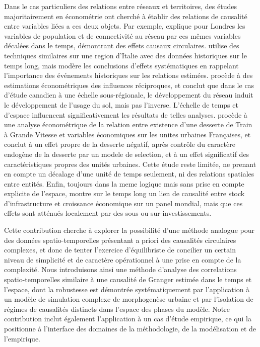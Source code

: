 \documentclass[french]{./sageo}
\begin{document}
Dans le cas particuliers des relations entre réseaux et territoires, des études majoritairement en économétrie ont cherché à établir des relations de causalité entre variables liées a ces deux objets. Par exemple, \cite{levinson2008density} explique pour Londres les variables de population et de connectivité au réseau par ces mêmes variables décalées dans le temps, démontrant des effets causaux circulaires. \cite{doi:10.1068/b39089}
 utilise des techniques similaires sur une region d'Italie avec des données historiques sur le temps long, mais modère les conclusions d'effets systématiques en rappelant l'importance des événements historiques sur les relations estimées. \cite{cuthbert2005empirical} procède à des estimations économétriques des influences réciproques, et conclut que dans le cas d'étude canadien à une échelle sous-régionale, le développement du réseau induit le développement de l'usage du sol, mais pas l'inverse. L'échelle de temps et d'espace influencent significativement les résultats de telles analyses. %
 procède à une analyse économétrique de la relation entre existence d'une desserte de Train à Grande Vitesse et variables économiques sur les unites urbaines Françaises, et conclut à un effet propre de la desserte négatif, après contrôle du caractère endogène de la desserte par un modele de selection, et à un effet significatif des caractéristiques propres des unités urbaines. Cette étude reste limitée, ne prenant en compte un décalage d'une unité de temps seulement, ni des relations spatiales entre entités. Enfin, toujours dans la meme logique mais sans prise en compte explicite de l'espace, %
  montre sur le temps long un lien de causalité entre stock d'infrastructure et croissance économique sur un panel mondial, mais que ces effets sont atténués localement par des sous ou sur-investissements.



Cette contribution cherche à explorer la possibilité d'une méthode analogue pour des données spatio-temporelles présentant a priori des causalités circulaires complexes, et donc de tenter l'exercice d'équilibriste de concilier un certain niveau de simplicité et de caractère opérationnel à une prise en compte de la complexité. Nous introduisons ainsi une méthode d'analyse des correlations spatio-temporelles similaire à une causalité de Granger estimée dans le temps et l'espace, dont la robustesse est démontrée systématiquement par l'application à un modèle de simulation complexe de morphogenèse urbaine et par l'isolation de régimes de causalités distincts dans l'espace des phases du modèle. Notre contribution inclut également l'application à un cas d'étude empirique, ce qui la positionne à l'interface des domaines de la méthodologie, de la modélisation et de l'empirique.
\end{document}
